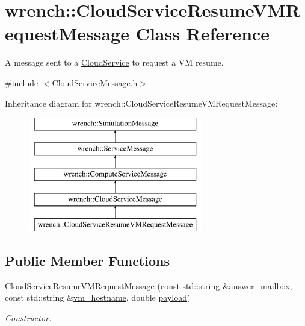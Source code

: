\hypertarget{classwrench_1_1_cloud_service_resume_v_m_request_message}{}\section{wrench\+:\+:Cloud\+Service\+Resume\+V\+M\+Request\+Message Class Reference}
\label{classwrench_1_1_cloud_service_resume_v_m_request_message}


A message sent to a \hyperlink{classwrench_1_1_cloud_service}{Cloud\+Service} to request a VM resume.  




{\ttfamily \#include $<$Cloud\+Service\+Message.\+h$>$}

Inheritance diagram for wrench\+:\+:Cloud\+Service\+Resume\+V\+M\+Request\+Message\+:\begin{figure}[H]
\begin{center}
\leavevmode
\includegraphics[height=5.000000cm]{classwrench_1_1_cloud_service_resume_v_m_request_message}
\end{center}
\end{figure}
\subsection*{Public Member Functions}
\begin{DoxyCompactItemize}
\item 
\hyperlink{classwrench_1_1_cloud_service_resume_v_m_request_message_aa9befbcf2e92ab3768cd6d222bbfe7a1}{Cloud\+Service\+Resume\+V\+M\+Request\+Message} (const std\+::string \&\hyperlink{classwrench_1_1_cloud_service_resume_v_m_request_message_a8bcb4ffbde216d0ec68dde391fc1f8d2}{answer\+\_\+mailbox}, const std\+::string \&\hyperlink{classwrench_1_1_cloud_service_resume_v_m_request_message_a77975278481b99f13380266ebf77f294}{vm\+\_\+hostname}, double \hyperlink{classwrench_1_1_simulation_message_a914f2732713f7c02898e66f05a7cb8a1}{payload})
\begin{DoxyCompactList}\small\item\em Constructor. \end{DoxyCompactList}\end{DoxyCompactItemize}
